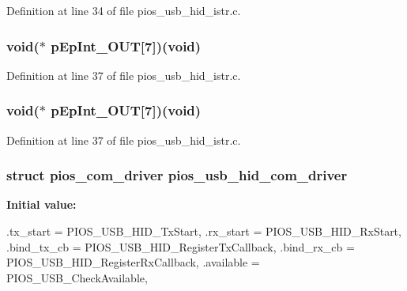 \-Definition at line 34 of file pios\-\_\-usb\-\_\-hid\-\_\-istr.\-c.

\hypertarget{group___p_i_o_s___u_s_b___h_i_d_ga549396ff4348c565f52117dd27ad52ca}{
\subsubsection[{p\-Ep\-Int\-\_\-\-O\-U\-T}]{\setlength{\rightskip}{0pt plus 5cm}void($\ast$ {\bf p\-Ep\-Int\-\_\-\-O\-U\-T}\mbox{[}7\mbox{]})(void)}}\label{group___p_i_o_s___u_s_b___h_i_d_ga549396ff4348c565f52117dd27ad52ca}


\-Definition at line 37 of file pios\-\_\-usb\-\_\-hid\-\_\-istr.\-c.

\hypertarget{group___p_i_o_s___u_s_b___h_i_d_ga549396ff4348c565f52117dd27ad52ca}{
\subsubsection[{p\-Ep\-Int\-\_\-\-O\-U\-T}]{\setlength{\rightskip}{0pt plus 5cm}void($\ast$ {\bf p\-Ep\-Int\-\_\-\-O\-U\-T}\mbox{[}7\mbox{]})(void)}}\label{group___p_i_o_s___u_s_b___h_i_d_ga549396ff4348c565f52117dd27ad52ca}


\-Definition at line 37 of file pios\-\_\-usb\-\_\-hid\-\_\-istr.\-c.

\hypertarget{group___p_i_o_s___u_s_b___h_i_d_ga7bc5f832e095cad60f463436e377bb5d}{
\subsubsection[{pios\-\_\-usb\-\_\-hid\-\_\-com\-\_\-driver}]{\setlength{\rightskip}{0pt plus 5cm}struct {\bf pios\-\_\-com\-\_\-driver} {\bf pios\-\_\-usb\-\_\-hid\-\_\-com\-\_\-driver}}}\label{group___p_i_o_s___u_s_b___h_i_d_ga7bc5f832e095cad60f463436e377bb5d}
{\bfseries \-Initial value\-:}
\begin{DoxyCode}
 {
        .tx_start    = PIOS_USB_HID_TxStart,
        .rx_start    = PIOS_USB_HID_RxStart,
        .bind_tx_cb  = PIOS_USB_HID_RegisterTxCallback,
        .bind_rx_cb  = PIOS_USB_HID_RegisterRxCallback,
        .available   = PIOS_USB_CheckAvailable,
}
\end{DoxyCode}


